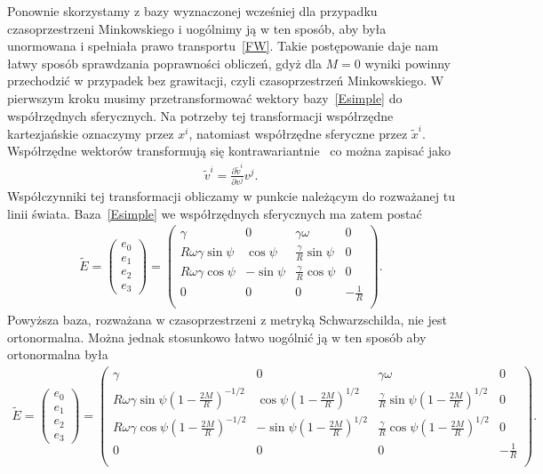 Ponownie skorzystamy z bazy wyznaczonej wcześniej dla przypadku
czasoprzestrzeni Minkowskiego i uogólnimy ją w ten sposób, 
aby była unormowana i spełniała prawo transportu~\eqref{FW}.
Takie postępowanie daje nam łatwy sposób sprawdzania poprawności
obliczeń, gdyż dla $M=0$ wyniki powinny przechodzić w przypadek 
bez grawitacji, czyli czasoprzestrzeń Minkowskiego.
W pierwszym kroku musimy przetransformować wektory bazy~\eqref{Esimple}
do współrzędnych sferycznych.  Na potrzeby tej transformacji
współrzędne kartezjańskie oznaczymy przez $x^i$, natomiast współrzędne 
sferyczne przez $\tilde{x}^i$. Współrzędne wektorów transformują 
się kontrawariantnie~\cite{inga1980} co można zapisać jako
\begin{align}\nonumber
\tilde{v}^i = \frac{\partial \tilde{v}^i}{\partial v^j} v^j.
\end{align}
Współczynniki tej transformacji obliczamy w punkcie należącym do 
rozważanej tu linii świata. Baza~\eqref{Esimple} we współrzędnych sferycznych
ma zatem postać 
\begin{align}\nonumber
\widetilde{E}=
\begin{pmatrix}
e_0\\
e_1\\
e_2\\
e_3
\end{pmatrix}
=
\begin{pmatrix}
\gamma & 0 & \gamma \omega & 0 \\
R\omega\gamma \sin \psi & \cos\psi & \frac{\gamma}{R} \sin\psi & 0\\
R\omega\gamma \cos \psi & -\sin\psi & \frac{\gamma}{R} \cos\psi & 0\\
0 & 0 & 0 & -\frac{1}{R} \\
\end{pmatrix}.
\end{align}
Powyższa baza, rozważana w czasoprzestrzeni z metryką
Schwarzschilda, nie jest ortonormalna. Można jednak stosunkowo łatwo
uogólnić ją w ten sposób aby ortonormalna była
\begin{align}\nonumber
\widetilde{E}=
\begin{pmatrix}
e_0\\
e_1\\
e_2\\
e_3
\end{pmatrix}
=
\begin{pmatrix}
\gamma & 0 & \gamma \omega & 0 \\
R\omega\gamma \sin \psi \left(1-\frac{2 M}{R} \right)^{-1/2} 
& \cos\psi\left(1-\frac{2 M}{R} \right)^{1/2} 
& \frac{\gamma}{R} \sin\psi\left(1-\frac{2 M}{R} \right)^{1/2} & 0\\
R\omega\gamma \cos \psi\left(1-\frac{2 M}{R} \right)^{-1/2} 
& -\sin\psi \left(1-\frac{2 M}{R} \right)^{1/2}
& \frac{\gamma}{R} \cos\psi \left(1-\frac{2 M}{R} \right)^{1/2}& 0\\
0 & 0 & 0 & -\frac{1}{R} \\
\end{pmatrix}.
\end{align}
